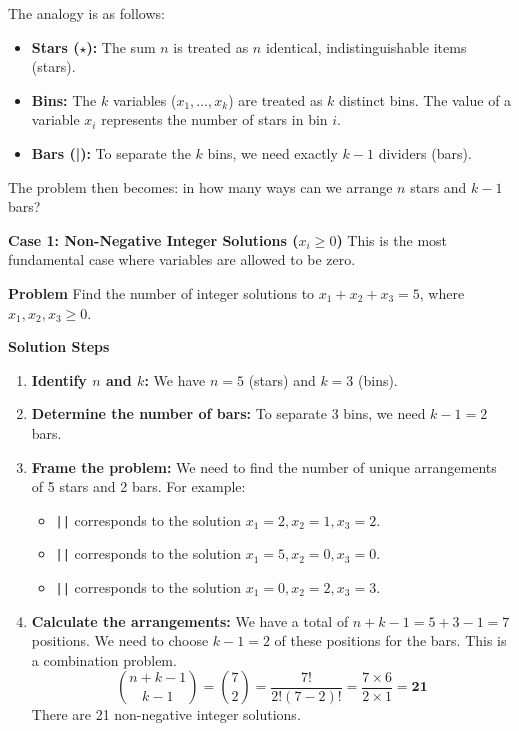 \begin{solutionbox}
    The analogy is as follows:
\begin{itemize}
    \item \textbf{Stars ($\star$):} The sum $n$ is treated as $n$ identical, indistinguishable items (stars).
    \item \textbf{Bins:} The $k$ variables ($x_1, \dots, x_k$) are treated as $k$ distinct bins. The value of a variable $x_i$ represents the number of stars in bin $i$.
    \item \textbf{Bars (|):} To separate the $k$ bins, we need exactly $k-1$ dividers (bars).
\end{itemize}
The problem then becomes: in how many ways can we arrange $n$ stars and $k-1$ bars?


\textbf{Case 1: Non-Negative Integer Solutions ($x_i \ge 0$)}
This is the most fundamental case where variables are allowed to be zero.

\textbf{Problem}
Find the number of integer solutions to $x_1 + x_2 + x_3 = 5$, where $x_1, x_2, x_3 \ge 0$.

\textbf{Solution Steps}
\begin{enumerate}
    \item \textbf{Identify $n$ and $k$:} We have $n=5$ (stars) and $k=3$ (bins).
    
    \item \textbf{Determine the number of bars:} To separate 3 bins, we need $k-1 = 2$ bars.
    
    \item \textbf{Frame the problem:} We need to find the number of unique arrangements of 5 stars and 2 bars. For example:
    \begin{itemize}
        \item \texttt{\star\star|\star|\star\star} corresponds to the solution $x_1=2, x_2=1, x_3=2$.
        \item \texttt{\star\star\star\star\star||} corresponds to the solution $x_1=5, x_2=0, x_3=0$.
        \item \texttt{|\star\star|\star\star\star} corresponds to the solution $x_1=0, x_2=2, x_3=3$.
    \end{itemize}
    
    \item \textbf{Calculate the arrangements:} We have a total of $n+k-1 = 5+3-1=7$ positions. We need to choose $k-1=2$ of these positions for the bars. This is a combination problem.
    \[
    \binom{n+k-1}{k-1} = \binom{7}{2} = \frac{7!}{2!(7-2)!} = \frac{7 \times 6}{2 \times 1} = \mathbf{21}
    \]
    There are 21 non-negative integer solutions.
\end{enumerate}


\end{solutionbox}
